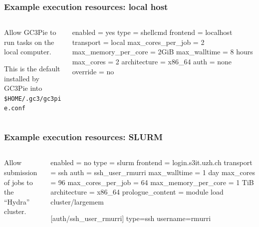 \documentclass[english,serif,mathserif,xcolor=pdftex,dvipsnames,table]{beamer}
\begin{document}
\begin{frame}[fragile,label=resources]
  \frametitle{Example execution resources: local host}
  \begin{columns}[t]
    \begin{column}{0.5\textwidth}
      Allow GC3Pie to run tasks on the local computer.

      \+ This is the default installed by GC3Pie
      into \lstinline|$HOME/.gc3/gc3pie.conf| %
    \end{column}
    \begin{column}{0.5\textwidth}
  \begin{stdout}
enabled = yes
type = shellcmd
frontend = localhost
transport = local
max_cores_per_job = 2
max_memory_per_core = 2GiB
max_walltime = 8 hours
max_cores = 2
architecture = x86_64
auth = none
override = no
\end{stdout}
    \end{column}
  \end{columns}
\end{frame}


\begin{frame}[fragile]
  \frametitle{Example execution resources: SLURM}
  \begin{columns}[t]
    \begin{column}{0.5\textwidth}
      Allow submission of jobs to the ``Hydra'' cluster.
    \end{column}
    \begin{column}{0.5\textwidth}
\begin{stdout}
enabled = no
type = slurm
frontend = login.s3it.uzh.ch
transport = ssh
auth = ssh_user_rmurri
max_walltime = 1 day
max_cores = 96
max_cores_per_job = 64
max_memory_per_core = 1 TiB
architecture = x86_64
prologue_content =
  module load cluster/largemem

[auth/ssh_user_rmurri]
type=ssh
username=rmurri
\end{stdout}
    \end{column}
  \end{columns}
\end{frame}
\end{document}
